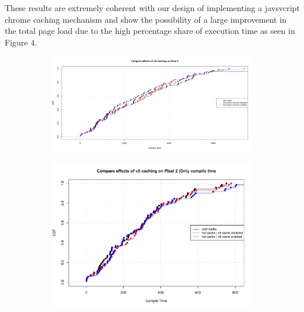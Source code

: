 These results are extremely coherent with our design of implementing a
javsvcript chrome caching mechanism and show the possibility of a
large improvement in the total page load due to the high percentage
share of execution time as seen in Figure 4. 
\begin{figure}[!bth]
\begin{subfigure}[b]{0.5\textwidth}
\centering
\includegraphics[width=0.9\columnwidth]{figs/v8cache_P2_scripting.pdf}
\label{fig:scripting_p2}
\end{subfigure}
\begin{subfigure}[b]{0.5\textwidth}
\centering
\includegraphics[width=0.9\columnwidth]{figs/v8cache_P2_compile.pdf}
\label{fig:compile_p2}
\end{subfigure}
\end{figure}

